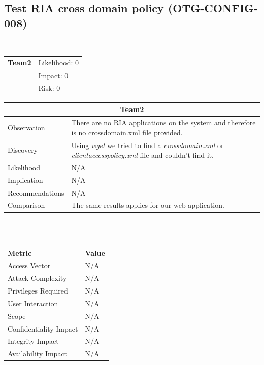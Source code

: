 \documentclass[headsepline,footsepline,footinclude=false,oneside,fontsize=11pt,paper=a4,listof=totoc,bibliography=totoc]{scrbook} %
\begin{document}
\subsection{Test RIA cross domain policy (OTG-CONFIG-008)}\
\begin{tabular}{cR{12cm}}
	\textbf{Team2} & Likelihood: 0\\& Impact: 0\\& Risk: 0
\end{tabular}

\begin{tabular}{ l|p{11cm}  }
	\hline
	\multicolumn{2}{c}{\textbf{Team2}} \\
	\hline
	Observation   & There are no RIA applications on the system and therefore is no crossdomain.xml file provided. \\
	Discovery  & Using \textit{wget} we tried to find a \textit{crossdomain.xml} or \textit{clientaccesspolicy.xml} file and couldn't find it. \\
	Likelihood & N/A \\
	Implication    & N/A \\
	Recommendations & N/A \\
	Comparison & The same results applies for our web application. \\
	\hline
\end{tabular}
\\
\vspace{0.5cm}
\\
\begin{center}
	\begin{tabular}{ll}
		\rowcolor[HTML]{34CDF9}
		{\color[HTML]{ECF4FF} \textbf{Metric}}        & {\color[HTML]{ECF4FF} \textbf{Value}} \\
		\rowcolor[HTML]{BBDAFF}
		{\color[HTML]{333333} Access Vector}          & {\color[HTML]{333333} } N/A              \\
		\rowcolor[HTML]{ECF4FF}
		{\color[HTML]{333333} Attack Complexity}      & {\color[HTML]{333333} } N/A              \\
		\rowcolor[HTML]{BBDAFF}
		{\color[HTML]{333333} Privileges Required}    & {\color[HTML]{333333} } N/A              \\
		\rowcolor[HTML]{ECF4FF}
		{\color[HTML]{333333} User Interaction}       & {\color[HTML]{333333} } N/A              \\
		\rowcolor[HTML]{BBDAFF}
		{\color[HTML]{333333} Scope}                  & {\color[HTML]{333333} } N/A              \\
		\rowcolor[HTML]{ECF4FF}
		{\color[HTML]{333333} Confidentiality Impact} & {\color[HTML]{333333} } N/A              \\
		\rowcolor[HTML]{BBDAFF}
		{\color[HTML]{333333} Integrity Impact}       & {\color[HTML]{333333} } N/A              \\
		\rowcolor[HTML]{ECF4FF}
		{\color[HTML]{333333} Availability Impact}    & {\color[HTML]{333333} } N/A
	\end{tabular}
\end{center}
\pagebreak
\end{document}

